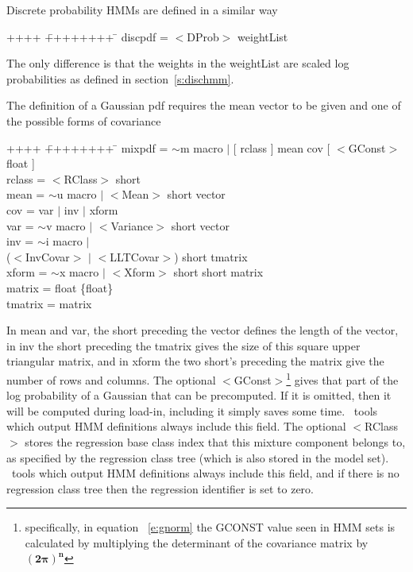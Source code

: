 Discrete probability HMMs are defined in a similar way
{\sf
\begin{tabbing}
++++ \= ++++++++ \=  \kill
\>   discpdf = \> $<$DProb$>$ weightList
\end{tabbing}
}
\noindent
The only difference is that the weights in the \textsf{weightList}
are scaled log probabilities as defined in section~\ref{s:dischmm}.

The definition of a Gaussian pdf requires the mean vector to 
be given and one of the possible forms of covariance 
{\sf
\begin{tabbing}
++++ \= ++++++++ \=  \kill
\>   mixpdf = \> $\sim$m macro $|$ [ rclass ] mean cov [ $<$GConst$>$ float ] \\
\>   rclass = \> $<$RClass$>$ short \\
\>   mean = \> $\sim$u macro $|$ $<$Mean$>$ short vector \\
\>   cov =  \> var $|$ inv $|$ xform \\
\>   var = \> $\sim$v macro $|$ $<$Variance$>$ short vector \\
\>   inv = \> $\sim$i macro $|$ \\
\>        \> ($<$InvCovar$>$ $|$ $<$LLTCovar$>$) short tmatrix \\
\>   xform = \> $\sim$x macro $|$ $<$Xform$>$ short short matrix \\
\>   matrix = \> float \{float\} \\
\>   tmatrix = \> matrix \\
\end{tabbing}
}
\noindent
In {\sf mean} and {\sf var}, the {\sf short} preceding the {\sf vector}
defines the length of the vector, in {\sf inv} the {\sf short} preceding the {\sf
tmatrix} gives the size of this square upper triangular matrix, and in {\sf xform} the
two {\sf short}'s preceding the {\sf matrix} give the number of rows and
columns. 
The optional {\sf $<$GConst$>$}\footnote{specifically, in equation 
~\ref{e:gnorm} 
the GCONST value seen in HMM sets is calculated by multiplying the determinant 
of the covariance matrix by $\bm{(2 \pi)^n}$}  gives 
that part of the log
probability of a Gaussian that can be precomputed.  If it is omitted, then
it will be computed during load-in, including it simply saves some time.
\HTK\ tools which output HMM definitions always include this field.
The optional {\sf $<$RClass$>$} stores the regression base class index that
this mixture component belongs to, as specified by the regression
class tree (which is also stored in the model set). \HTK\ tools which
output HMM definitions always include this field, and if there is no
regression class tree then the regression identifier is set to zero.


